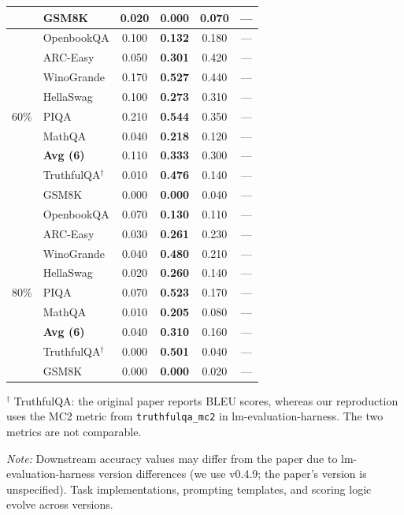\documentclass[11pt,a4paper]{article}
\theoremstyle{remark}
\begin{document}
\begin{table}[H]
\begin{tabular}{@{}cl cccc@{}}
  & GSM8K                & 0.020 & \textbf{0.000} & 0.070 & --- \\
\midrule
\multirow{9}{*}{60\%}
  & OpenbookQA           & 0.100 & \textbf{0.132} & 0.180 & --- \\
  & ARC-Easy             & 0.050 & \textbf{0.301} & 0.420 & --- \\
  & WinoGrande           & 0.170 & \textbf{0.527} & 0.440 & --- \\
  & HellaSwag            & 0.100 & \textbf{0.273} & 0.310 & --- \\
  & PIQA                 & 0.210 & \textbf{0.544} & 0.350 & --- \\
  & MathQA               & 0.040 & \textbf{0.218} & 0.120 & --- \\
  \cmidrule(l){2-6}
  & \textbf{Avg (6)}     & 0.110 & \textbf{0.333} & 0.300 & --- \\
  & TruthfulQA$^\dagger$ & 0.010 & \textbf{0.476} & 0.140 & --- \\
  & GSM8K                & 0.000 & \textbf{0.000} & 0.040 & --- \\
\midrule
\multirow{9}{*}{80\%}
  & OpenbookQA           & 0.070 & \textbf{0.130} & 0.110 & --- \\
  & ARC-Easy             & 0.030 & \textbf{0.261} & 0.230 & --- \\
  & WinoGrande           & 0.040 & \textbf{0.480} & 0.210 & --- \\
  & HellaSwag            & 0.020 & \textbf{0.260} & 0.140 & --- \\
  & PIQA                 & 0.070 & \textbf{0.523} & 0.170 & --- \\
  & MathQA               & 0.010 & \textbf{0.205} & 0.080 & --- \\
  \cmidrule(l){2-6}
  & \textbf{Avg (6)}     & 0.040 & \textbf{0.310} & 0.160 & --- \\
  & TruthfulQA$^\dagger$ & 0.000 & \textbf{0.501} & 0.040 & --- \\
  & GSM8K                & 0.000 & \textbf{0.000} & 0.020 & --- \\
\bottomrule
\end{tabular}

\smallskip
\noindent\footnotesize$^\dagger$ TruthfulQA: the original paper reports BLEU scores,
whereas our reproduction uses the MC2 metric from \texttt{truthfulqa\_mc2}
in lm-evaluation-harness. The two metrics are not comparable.

\smallskip
\noindent\footnotesize\textit{Note:}
Downstream accuracy values may differ from the paper due to
lm-evaluation-harness version differences (we use v0.4.9;
the paper's version is unspecified). Task implementations,
prompting templates, and scoring logic evolve across versions.
\end{table}
\end{document}
